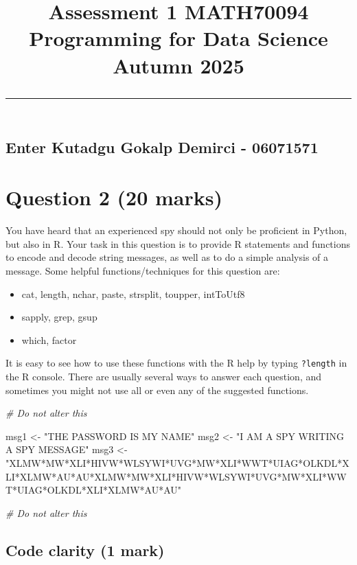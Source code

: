 \documentclass[
]{article}
\title{\normalsize Assessment 1 \hfill MATH70094 Programming for Data
Science \hfill Autumn 2025\\
\rule{\linewidth}{0.5mm}}
\author{}
\date{\vspace{-2.5em}}
\newenvironment{Shaded}{\begin{snugshade}}{\end{snugshade}}
\newcommand{\CommentTok}[1]{\textcolor[rgb]{0.56,0.35,0.01}{\textit{#1}}}
\newcommand{\NormalTok}[1]{#1}
\newcommand{\OtherTok}[1]{\textcolor[rgb]{0.56,0.35,0.01}{#1}}
\newcommand{\StringTok}[1]{\textcolor[rgb]{0.31,0.60,0.02}{#1}}
\providecommand{\tightlist}{%
  \setlength{\itemsep}{0pt}\setlength{\parskip}{0pt}}
\begin{document}
\maketitle

\subsection{Enter Kutadgu Gokalp Demirci -
06071571}\label{enter-kutadgu-gokalp-demirci---06071571}

\section{Question 2 (20 marks)}\label{question-2-20-marks}

You have heard that an experienced spy should not only be proficient in
Python, but also in R. Your task in this question is to provide R
statements and functions to encode and decode string messages, as well
as to do a simple analysis of a message. Some helpful
functions/techniques for this question are:

\begin{itemize}
\tightlist
\item
  cat, length, nchar, paste, strsplit, toupper, intToUtf8
\item
  sapply, grep, gsup
\item
  which, factor
\end{itemize}

It is easy to see how to use these functions with the R help by typing
\texttt{?length} in the R console. There are usually several ways to
answer each question, and sometimes you might not use all or even any of
the suggested functions.

\begin{Shaded}
\begin{Highlighting}[]
\CommentTok{\# Do not alter this}

\NormalTok{msg1 }\OtherTok{\textless{}{-}} \StringTok{"THE PASSWORD IS MY NAME"} 
\NormalTok{msg2 }\OtherTok{\textless{}{-}} \StringTok{"I AM A SPY WRITING A SPY MESSAGE"}
\NormalTok{msg3 }\OtherTok{\textless{}{-}} \StringTok{"XLMW*MW*XLI*HIVW*WLSYWI*UVG*MW*XLI*WWT*UIAG*OLKDL*XLI*XLMW*AU*AU*XLMW*MW*XLI*HIVW*WLSYWI*UVG*MW*XLI*WWT*UIAG*OLKDL*XLI*XLMW*AU*AU"}

\CommentTok{\# Do not alter this}
\end{Highlighting}
\end{Shaded}

\subsection{Code clarity (1 mark)}\label{code-clarity-1-mark}
\end{document}

